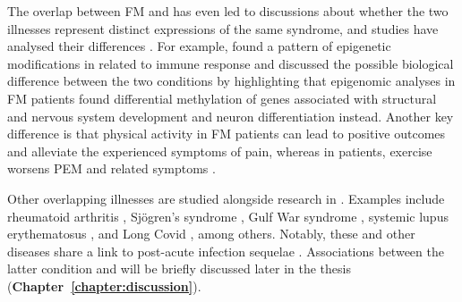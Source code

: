 The overlap between FM and \cfs has even led to discussions about whether the two illnesses represent distinct expressions of the same syndrome, and studies have analysed their differences \citep{abbiChronicFatigueSyndrome2012, castro-marrero2013CouldMitochondrial}.
For example, \citet{vegaDNAMethylationModifications2014} found a pattern of epigenetic modifications in \cfs related to immune response and discussed the possible biological difference between the two conditions by highlighting that epigenomic analyses in FM patients found differential methylation of genes associated with structural and nervous system development and neuron differentiation instead.
Another key difference is that physical activity in FM patients can lead to positive outcomes and alleviate the experienced symptoms of pain, whereas in \cfs patients, exercise worsens PEM and related symptoms \citep{hauser2010EfficacyDifferent, kodner2015CommonQuestions}.


Other overlapping illnesses are studied alongside research in \cfs.
Examples include rheumatoid arthritis \citep{moss-morris2003IllnessPerceptions, davis2008ChronicStressa, ali2017FatiguePsychosocial}, Sj\"{o}gren's syndrome \citep{calabrese1994ChronicFatigue, kim2023CharacterizingSjogrenAssociated}, Gulf War syndrome \citep{kang2003PosttraumaticStress, halpin2017MyalgicEncephalomyelitis}, systemic lupus erythematosus \citep{sotznyMyalgicEncephalomyelitisChronic2018}, and Long Covid \citep{komaroff2023MECFS, gil2023IdentificationCD8}, among others.%
Notably, these and other diseases share a link to post-acute infection sequelae \citep{choutka2022UnexplainedPostacute}.
Associations between the latter condition and \cfs will be briefly discussed later in the thesis (\textbf{Chapter~\ref{chapter:discussion}}).


